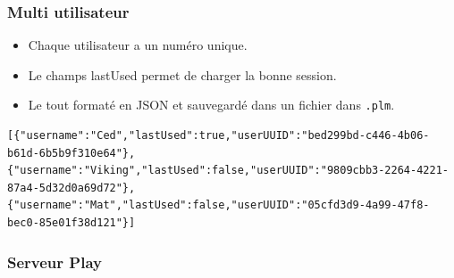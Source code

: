 \begin{frame}[containsverbatim]
	\frametitle{Multi utilisateur}
	\begin{itemize}
	\item Chaque utilisateur a un numéro unique.
	\item Le champs lastUsed permet de charger la bonne session.
	\item Le tout formaté en JSON et sauvegardé dans un fichier dans \texttt{.plm}.
	\end{itemize}
	\begin{lstlisting}[language = plm,basicstyle={\tiny\ttfamily}, caption= plm.users]
[{"username":"Ced","lastUsed":true,"userUUID":"bed299bd-c446-4b06-b61d-6b5b9f310e64"}, {"username":"Viking","lastUsed":false,"userUUID":"9809cbb3-2264-4221-87a4-5d32d0a69d72"}, {"username":"Mat","lastUsed":false,"userUUID":"05cfd3d9-4a99-47f8-bec0-85e01f38d121"}]
	\end{lstlisting}
\end{frame}

\begin{frame}
	\frametitle{Serveur Play}
	\begin{center}
		
	\end{center}
\end{frame}

